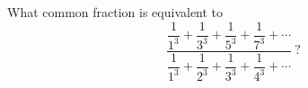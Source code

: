 What common fraction is equivalent to
\[\dfrac{\dfrac{1}{1^3}+\dfrac{1}{3^3}+\dfrac{1}{5^3}+\dfrac{1}{7^3}+\cdots}{\dfrac{1}{1^3}+\dfrac{1}{2^3}+\dfrac{1}{3^3}+\dfrac{1}{4^3}+\cdots}\ ?\]
